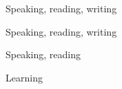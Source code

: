 
	Speaking, reading, writing\\
	\divider

	Speaking, reading, writing\\
	\divider

	Speaking, reading\\
	\divider

	Learning\\

	\medskip